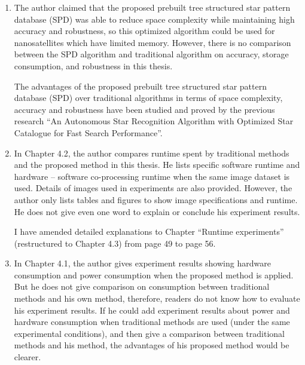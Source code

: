 \documentclass[dvips,a4paper,12pt]{article}
\begin{document}
\begin{enumerate}
    \color{blue}
    \item The author claimed that the proposed prebuilt tree structured star pattern database (SPD) was able to reduce space complexity while maintaining high accuracy and robustness, so this optimized algorithm could be used for nanosatellites which have limited memory. However, there is no comparison between the SPD algorithm and traditional algorithm on accuracy, storage consumption, and robustness in this thesis.

    \color{black}
    The advantages of the proposed prebuilt tree structured star pattern database (SPD) over traditional algorithms in terms of space complexity, accuracy and robustness have been studied and proved by the previous research ``An Autonomous Star Recognition Algorithm with Optimized Star Catalogue for Fast Search Performance''\cite{MDP}.

    \color{blue}
    \item In Chapter 4.2, the author compares runtime spent by traditional methods and the proposed method in this thesis. He lists specific software runtime and hardware – software co-processing runtime when the same image dataset is used. Details of images used in experiments are also provided. However, the author only lists tables and figures to show image specifications and runtime. He does not give even one word to explain or conclude his experiment results.

    \color{black}
    I have amended detailed explanations to Chapter ``Runtime experiments'' (restructured to Chapter 4.3) from page 49 to page 56.

    \newpage
    \color{blue}
    \item In Chapter 4.1, the author gives experiment results showing hardware consumption and power consumption when the proposed method is applied. But he does not give comparison on consumption between traditional methods and his own method, therefore, readers do not know how to evaluate his experiment results. If he could add experiment results about power and hardware consumption when traditional methods are used (under the same experimental conditions), and then give a comparison between traditional methods and his method, the advantages of his proposed method would be clearer.


\end{enumerate}
\end{document}
